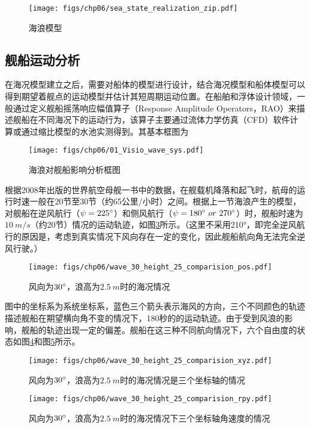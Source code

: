  \begin{figure}[!ht]
	\centering
	\texttt{[image: figs/chp06/sea\_state\_realization\_zip.pdf]}	
	\caption{海浪模型}
	\label{fig:sea_state_realization_zip}
\end{figure}

\subsection{舰船运动分析}
在海况模型建立之后，需要对船体的模型进行设计，结合海况模型和船体模型可以得到期望着舰点的运动模型并估计其短周期运动位置。在船舶和浮体设计领域，一般通过定义舰船摇荡响应幅值算子（Response Amplitude Operators，RAO）来描述舰船在不同海况下的运动行为，该算子主要通过流体力学仿真（CFD）软件计算或通过缩比模型的水池实测得到。其基本框图为

 \begin{figure}[!ht]
	\centering
	\texttt{[image: figs/chp06/01\_Visio\_wave\_sys.pdf]}	
	\caption{海浪对舰船影响分析框图}
	\label{fig:01_Visio_wave_sys}
\end{figure}
根据2008年出版的世界航空母舰一书中的数据，在舰载机降落和起飞时，航母的运行时速一般在20节至30节（约65公里/小时）之间。根据上一节海浪产生的模型，对舰船在逆风航行（$\psi=225\degree$）和侧风航行（$\psi = 180\degree\  or\  270\degree$）时，舰船时速为$10\ m/s$（约20节）情况的运动轨迹，如图\ref{fig:wave_30_height_25_comparision_pos}所示。（这里不采用210°，即完全逆风航行的原因是，考虑到真实情况下风向存在一定的变化，因此舰船航向角无法完全逆风行驶。）
 \begin{figure}[!ht]
	\centering
	\texttt{[image: figs/chp06/wave\_30\_height\_25\_comparision\_pos.pdf]}	
	\caption{风向为$30\degree$，浪高为$2.5\ m$时的海况情况}
	\label{fig:wave_30_height_25_comparision_pos}
\end{figure}
图中的坐标系为系统坐标系，蓝色三个箭头表示海风的方向，三个不同颜色的轨迹描述舰船在期望横向角不变的情况下，180秒的的运动轨迹。由于受到风浪的影响，舰船的轨迹出现一定的偏差。舰船在这三种不同航向情况下，六个自由度的状态如图\ref{fig:wave_30_height_25_comparision_xyz}和图\ref{fig:wave_30_height_25_comparision_rpy}所示。

 \begin{figure}[!ht]
	\centering
	\texttt{[image: figs/chp06/wave\_30\_height\_25\_comparision\_xyz.pdf]}	
	\caption{风向为$30\degree$，浪高为$2.5\ m$时的海况情况是三个坐标轴的情况}
	\label{fig:wave_30_height_25_comparision_xyz}
\end{figure}
 \begin{figure}[!ht]
	\centering
	\texttt{[image: figs/chp06/wave\_30\_height\_25\_comparision\_rpy.pdf]}	
	\caption{风向为$30\degree$，浪高为$2.5\ m$时的海况情况下三个坐标轴角速度的情况}
	\label{fig:wave_30_height_25_comparision_rpy}
\end{figure}

